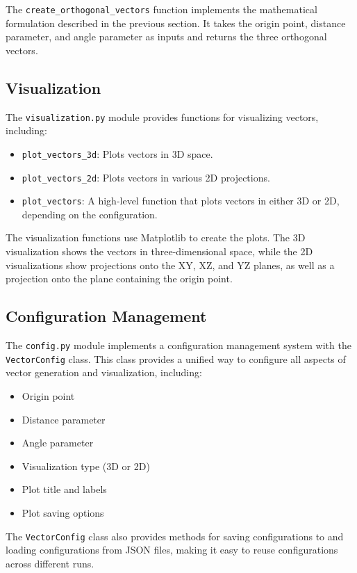 The \texttt{create\_orthogonal\_vectors} function implements the mathematical formulation described in the previous section. It takes the origin point, distance parameter, and angle parameter as inputs and returns the three orthogonal vectors.

\subsection{Visualization}

The \texttt{visualization.py} module provides functions for visualizing vectors, including:

\begin{itemize}
    \item \texttt{plot\_vectors\_3d}: Plots vectors in 3D space.
    \item \texttt{plot\_vectors\_2d}: Plots vectors in various 2D projections.
    \item \texttt{plot\_vectors}: A high-level function that plots vectors in either 3D or 2D, depending on the configuration.
\end{itemize}

The visualization functions use Matplotlib to create the plots. The 3D visualization shows the vectors in three-dimensional space, while the 2D visualizations show projections onto the XY, XZ, and YZ planes, as well as a projection onto the plane containing the origin point.

\subsection{Configuration Management}

The \texttt{config.py} module implements a configuration management system with the \texttt{VectorConfig} class. This class provides a unified way to configure all aspects of vector generation and visualization, including:

\begin{itemize}
    \item Origin point
    \item Distance parameter
    \item Angle parameter
    \item Visualization type (3D or 2D)
    \item Plot title and labels
    \item Plot saving options
\end{itemize}

The \texttt{VectorConfig} class also provides methods for saving configurations to and loading configurations from JSON files, making it easy to reuse configurations across different runs.

